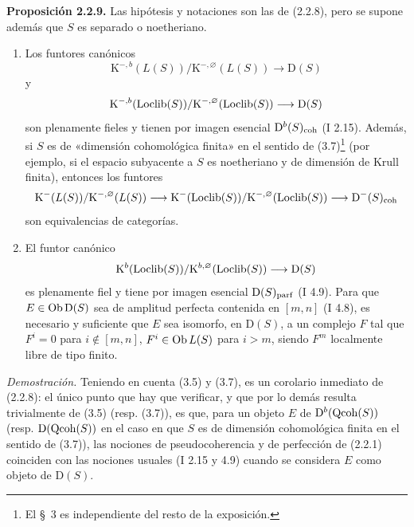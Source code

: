 \providecommand{\sisi}[2]{#2}

\textbf{Proposición 2.2.9.} Las hipótesis y notaciones son las de (2.2.8), pero se supone además que $S$ es separado o noetheriano.
\begin{enumerate}[label=\alph*)]
\item Los funtores canónicos
\[
\mathrm K^{-,b}(L(S))/\mathrm K^{-,\varnothing}(L(S))\longrightarrow\mathrm D(S)
\]
y
\[
\mathrm K^{-,b}(\operatorname{Loclib}(S))/\mathrm K^{-,\varnothing}(\operatorname{Loclib}(S))\longrightarrow\mathrm D(S)
\]
son plenamente fieles y tienen por imagen esencial $\mathrm D^b(S)_{\mathrm{coh}}$ (I 2.15). Además, si $S$ es de «dimensión cohomológica finita» en el sentido de (3.7)\footnote{El \S~3 es independiente del resto de la exposición.} (por ejemplo, si el espacio subyacente a $S$ es noetheriano y de dimensión de Krull finita), entonces los funtores
\[
\mathrm K^{-}(L(S))/\mathrm K^{-,\varnothing}(L(S))\longrightarrow
\mathrm K^{-}(\operatorname{Loclib}(S))/\mathrm K^{-,\varnothing}(\operatorname{Loclib}(S))\longrightarrow
\mathrm D^{-}(S)_{\mathrm{coh}}
\]
son equivalencias de categorías.
\item El funtor canónico
\[
\mathrm K^b(\operatorname{Loclib}(S))/\mathrm K^{b,\varnothing}(\operatorname{Loclib}(S))\longrightarrow\mathrm D(S)
\]
es plenamente fiel y tiene por imagen esencial $\mathrm D(S)_{\mathrm{parf}}$ (I 4.9). Para que $E\in\operatorname{Ob}\mathrm D(S)$ sea de amplitud perfecta contenida en $[m,n]$ (I 4.8), es necesario y suficiente que $E$ sea isomorfo, en $\mathrm D(S)$, a un complejo $F$ tal que $F^i=0$ para $i\notin[m,n]$, $F^i\in\sisi{\Ob L(S))}{\Ob L(S)}$ para $i>m$, siendo $F^m$ localmente libre de tipo finito.
\end{enumerate}

\emph{Demostración.} Teniendo en cuenta (3.5) y (3.7), es un corolario inmediato de (2.2.8): el único punto que hay que verificar, y que por lo demás resulta trivialmente de (3.5) (resp. (3.7)), es que, para un objeto $E$ de $\mathrm D^b(\operatorname{Qcoh}(S))$ (resp. $\mathrm D(\operatorname{Qcoh}(S))$ en el caso en que $S$ es de dimensión cohomológica finita en el sentido de (3.7)), las nociones de pseudocoherencia y de perfección de (2.2.1) coinciden con las nociones usuales (I 2.15 y 4.9) cuando se considera $E$ como objeto de $\mathrm D(S)$.

